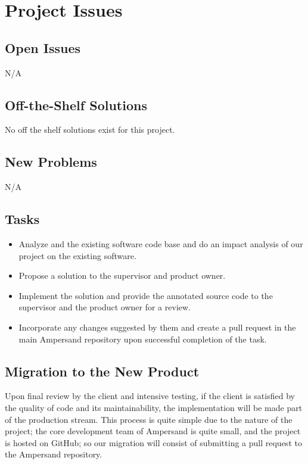 \documentclass[12pt]{report}
\begin{document}
\chapter{Project Issues}\label{ch:issues}
\section{Open Issues}\label{sec:issues}
N/A%
\section{Off-the-Shelf Solutions}\label{sec:solutions}
No off the shelf solutions exist for this project.
\section{New Problems}\label{sec:NewProblems}
N/A%
\section{Tasks}\label{sec:Tasks}
\begin{itemize}
\item Analyze and the existing software code base and do an impact analysis of our project on the existing software.
\item Propose a solution to the supervisor and product owner.
\item Implement the solution and provide the  annotated source code to the supervisor and the product owner for a review.
\item Incorporate any changes suggested by them and create a pull request in the main Ampersand repository upon successful completion of the task.
\end{itemize}
%
\section{Migration to the New Product}\label{sec:Migration}
Upon final review by the client and intensive testing, if the client is
satisfied by the quality of code and its maintainability, the implementation
will be made part of the production stream.  This process is quite simple due to
the nature of the project; the core development team of Ampersand is quite
small, and the project is hosted on GitHub; so our migration will consist of
submitting a pull request to the Ampersand repository.
\end{document}
